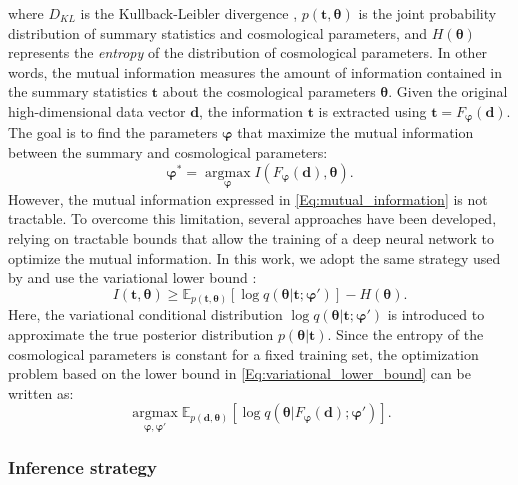 \documentclass{aa}
\begin{document}
where $D_{KL}$ is the Kullback-Leibler divergence \citep{kullback1951information}, $p(\bm {t}, \bm {\theta})$ is the joint probability distribution of summary statistics and cosmological parameters, and $H(\bm {\theta})$ represents the \textit{entropy} of the distribution of cosmological parameters.  
In other words, the mutual information measures the amount of information contained in the summary statistics $\bm t$ about the cosmological parameters $\bm \theta$.
Given the original high-dimensional data vector $\bm d$, the information $\bm t$ is extracted using $\bm {t}=F_{\bm {\varphi}}(\bm {d})$. 
The goal is to find the parameters $\bm {\varphi}$ that maximize the mutual information between the summary and cosmological parameters:
\begin{equation}
   \bm {\varphi}^*= \operatorname*{argmax}_{\bm {\varphi}} I(F_{\bm {\varphi}}(\bm{d}), \bm {\theta}).
\end{equation}
However, the mutual information expressed in \autoref{Eq:mutual_information} is not tractable. To overcome this limitation,  several approaches have been developed, relying on tractable bounds that allow the training of a deep neural network to optimize the mutual information. In this work, we adopt the same strategy used by \citet{jeffrey2021likelihood} and use the variational lower bound \citep{barber2003information}:
\begin{equation}\label{Eq:variational_lower_bound}
    I(\bm{t}, \bm{\theta}) \ge \mathbb{E}_{p(\bm {t}, \bm {\theta})} [\log{q(\bm {\theta} |\bm{t} ; \bm{\varphi}')}]- H(\bm {\theta}).
\end{equation}
Here, the variational conditional distribution $\log{q(\bm {\theta} |\bm{t} ; \bm{\varphi}')}$ is introduced to approximate the true posterior distribution $p(\bm{\theta}|\bm {t})$. 
Since the entropy of the cosmological parameters is constant for a fixed training set, the optimization problem based on the lower bound in  \autoref{Eq:variational_lower_bound} can be written as:
\begin{equation}
    \operatorname*{argmax}_{\bm {\varphi}, \bm {\varphi}'}\mathbb{E}_{p(\bm {d}, \bm {\theta})} [\log{q(\bm {\theta} |F_{\bm {\varphi}}(\bm {d}) ; \bm{\varphi}')}].
\end{equation}
\subsubsection{Inference strategy}
\end{document}
